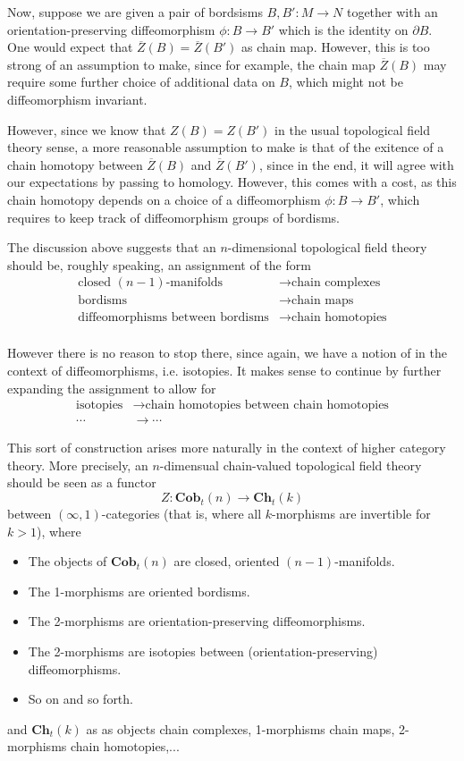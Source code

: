 \documentclass[a4paper,11pt]{article}
\theoremstyle{plain}
\theoremstyle{definition}
\theoremstyle{remark}
\begin{document}
Now, suppose we are given a pair of bordsisms $B, B' \colon M \to N$ together with an orientation-preserving diffeomorphism $\phi \colon B \to B'$ which is the identity on $\partial B$. One would expect that $\overline{Z}(B) = \overline{Z}(B')$ as chain map. However, this is too strong of an assumption to make, since for example, the chain map $\overline{Z}(B)$ may require some further choice of additional data on $B$, which might not be diffeomorphism invariant. 

However, since we know that $Z(B) = Z(B')$ in the usual topological field theory sense, a more reasonable assumption to make is that of the exitence of a chain homotopy between $\overline{Z}(B)$ and $\overline{Z}(B')$, since in the end, it will agree with our expectations by passing to homology. However, this comes with a cost, as this chain homotopy depends on a choice of a diffeomorphism $\phi \colon B \to B'$, which requires to keep track of diffeomorphism groups of bordisms. 




The discussion above suggests that an $n$-dimensional topological field theory should be, roughly speaking, an assignment of the form 
\begin{align*}
    \text{closed $(n-1)$-manifolds} & \longrightarrow \text{chain complexes}\\
    \text{bordisms} & \longrightarrow \text{chain maps}\\
    \text{diffeomorphisms between bordisms} & \longrightarrow \text{chain homotopies}\\
\end{align*}

However there is no reason to stop there, since again, we have a notion of  in the context of diffeomorphisms, i.e. isotopies. It makes sense to continue by further expanding the assignment to allow for
\begin{align*}
    \text{isotopies} & \longrightarrow \text{chain homotopies between chain homotopies}\\
    \cdots & \longrightarrow \cdots
\end{align*}

This sort of construction arises more naturally in the context of higher category theory. More precisely, an $n$-dimensual chain-valued topological field theory should be seen as a functor 
$$Z \colon \textbf{Cob}_t(n) \to \textbf{Ch}_t(k)$$
between $(\infty, 1)$-categories (that is, where all $k$-morphisms are invertible for $k>1$), where 
\begin{itemize}
    \item The objects of $\textbf{Cob}_t(n)$ are closed, oriented $(n-1)$-manifolds.
    \item The 1-morphisms are oriented bordisms.
    \item The 2-morphisms are orientation-preserving diffeomorphisms.
    \item The 2-morphisms are isotopies between (orientation-preserving) diffeomorphisms.
    \item So on and so forth. 
\end{itemize}
and $\textbf{Ch}_t(k)$ as as objects chain complexes, 1-morphisms chain maps, 2-morphisms chain homotopies,...
\end{document}
